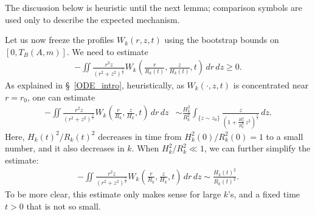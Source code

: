 \documentclass[reqno,11pt]{amsart}
\begin{document}
The discussion below is heuristic until the next lemma; comparison symbols are used only to describe the expected mechanism.

Let us now freeze the profiles $W_k(r,z,t)$ using the bootstrap bounds on $[0,T_B(A,m)]$.  
We need to estimate
    \begin{align*}
        -\iint 
        \frac{r^2 z}{(r^2+z^2)^{\frac{5}{2}}}
        W_k\left(
            \frac{r}{R_k(t)}, \frac{z}{H_k(t)}, t
        \right) \, dr \, dz \geq 0.
    \end{align*}
As explained in \S~\ref{ODE_intro}, heuristically, as $W_k(\cdot,z,t)$ is concentrated near $r=r_0$, one can estimate 
    \begin{align*}
        -\iint 
        \frac{r^2 z}{(r^2+z^2)^{\frac{5}{2}}}
        W_k\left(
            \frac{r}{R_k}, \frac{z}{H_k}, t
        \right) \, dr \, dz
    &\sim
        \frac{H_k^2}{R_k^2}
        \int_{\{z\sim z_0\}}
        \frac{z}{ \left (1+ \frac{H_k^2}{R_k^2}  \, z^2 \right)^{\frac{5}{2}} } \, dz.
    \end{align*}
Here, $H_k(t)^2/R_k(t)^2$ decreases in time from $H_k^2(0)/R_k^2(0)=1$ to a small number, and it also decreases in $k$. When $H_k^2/R_k^2\ll1$, we can further simplify the estimate:
    \begin{align*}
         -\iint 
        \frac{r^2 z}{(r^2+z^2)^{\frac{5}{2}}}
        W_k\left(
            \frac{r}{R_k}, \frac{z}{H_k}, t
        \right) \, dr \, dz \sim \frac{H_k(t)^2}{R_k(t)^2}.
    \end{align*}
To be more clear, this estimate only makes sense for large $k$'s, and a fixed time $t>0$ that is not so small. 
\end{document}

